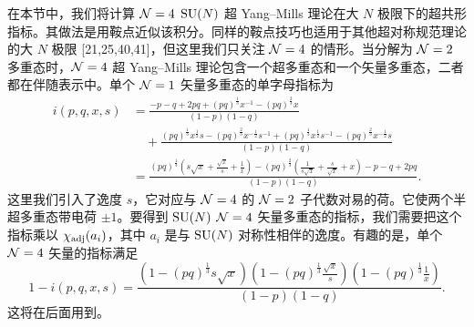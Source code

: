 在本节中，我们将计算 $\mathcal{N}=4$ $\operatorname{SU}(N)$ 超 Yang–Mills 理论在大 $N$ 极限下的超共形指标。其做法是用鞍点近似该积分。同样的鞍点技巧也适用于其他超对称规范理论的大 $N$ 极限 [21,25,40,41]，但这里我们只关注 $\mathcal{N}=4$ 的情形。当分解为 $\mathcal{N}=2$ 多重态时，$\mathcal{N}=4$ 超 Yang–Mills 理论包含一个超多重态和一个矢量多重态，二者都在伴随表示中。单个 $\mathcal{N}=1$ 矢量多重态的单字母指标为
\[
\begin{aligned}
i(p,q,x,s)&=\frac{-p-q+2pq+(pq)^{\frac13}x^{-1}-(pq)^{\frac23}x}{(1-p)(1-q)}\\
&\quad+\frac{(pq)^{\frac13}x^{\frac12}s-(pq)^{\frac23}x^{-\frac12}s^{-1}+(pq)^{\frac13}x^{\frac12}s^{-1}-(pq)^{\frac23}x^{-\frac12}s}{(1-p)(1-q)}\\
&=\frac{(pq)^{\frac13}(s\sqrt x+\frac{\sqrt x}{s}+\frac1x)-(pq)^{\frac23}(\frac{1}{s\sqrt x}+\frac{s}{\sqrt x}+x)-p-q+2pq}{(1-p)(1-q)} .
\end{aligned}
\tag{4.1}
\]
这里我们引入了逸度 $s$，它对应与 $\mathcal{N}=4$ 的 $\mathcal{N}=2$ 子代数对易的荷。它使两个半超多重态带电荷 $\pm1$。要得到 $\operatorname{SU}(N)$ $\mathcal{N}=4$ 矢量多重态的指标，我们需要把这个指标乘以 $\chi_{\operatorname{adj}}(a_i)$，其中 $a_i$ 是与 $\operatorname{SU}(N)$ 对称性相伴的逸度。有趣的是，单个 $\mathcal{N}=4$ 矢量的指标满足
\[
1-i(p,q,x,s)=\frac{(1-(pq)^{\frac13}s\sqrt x)(1-(pq)^{\frac13}\frac{\sqrt x}{s})(1-(pq)^{\frac13}\frac1x)}{(1-p)(1-q)} .
\tag{4.2}
\]
这将在后面用到。


